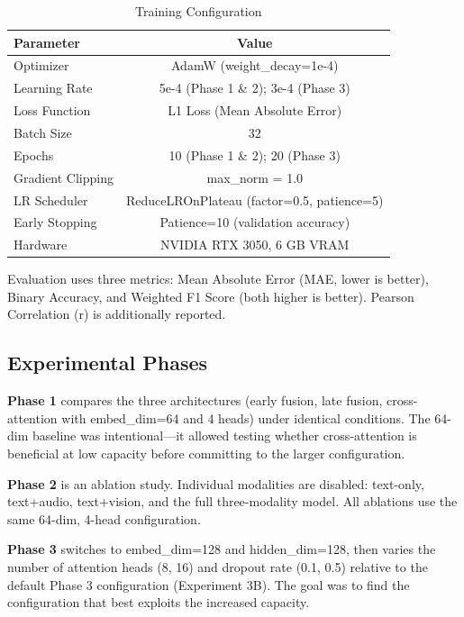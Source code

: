 \documentclass[conference]{IEEEtran}
\begin{document}
\begin{table}[h]
\renewcommand{\arraystretch}{1.3}
\caption{Training Configuration}
\label{tab:training}
\centering
\begin{tabular}{|l|c|}
\hline
\textbf{Parameter} & \textbf{Value} \\
\hline
Optimizer & AdamW (weight\_decay=1e-4) \\
Learning Rate & 5e-4 (Phase 1 \& 2); 3e-4 (Phase 3) \\
Loss Function & L1 Loss (Mean Absolute Error) \\
Batch Size & 32 \\
Epochs & 10 (Phase 1 \& 2); 20 (Phase 3) \\
Gradient Clipping & max\_norm = 1.0 \\
LR Scheduler & ReduceLROnPlateau (factor=0.5, patience=5) \\
Early Stopping & Patience=10 (validation accuracy) \\
Hardware & NVIDIA RTX 3050, 6 GB VRAM \\
\hline
\end{tabular}
\end{table}

Evaluation uses three metrics: Mean Absolute Error (MAE, lower is better), Binary Accuracy, and Weighted F1 Score (both higher is better). Pearson Correlation (r) is additionally reported.

\subsection{Experimental Phases}

\textbf{Phase 1} compares the three architectures (early fusion, late fusion, cross-attention with embed\_dim=64 and 4 heads) under identical conditions. The 64-dim baseline was intentional---it allowed testing whether cross-attention is beneficial at low capacity before committing to the larger configuration.

\textbf{Phase 2} is an ablation study. Individual modalities are disabled: text-only, text+audio, text+vision, and the full three-modality model. All ablations use the same 64-dim, 4-head configuration.

\textbf{Phase 3} switches to embed\_dim=128 and hidden\_dim=128, then varies the number of attention heads (8, 16) and dropout rate (0.1, 0.5) relative to the default Phase 3 configuration (Experiment 3B). The goal was to find the configuration that best exploits the increased capacity.
\end{document}
